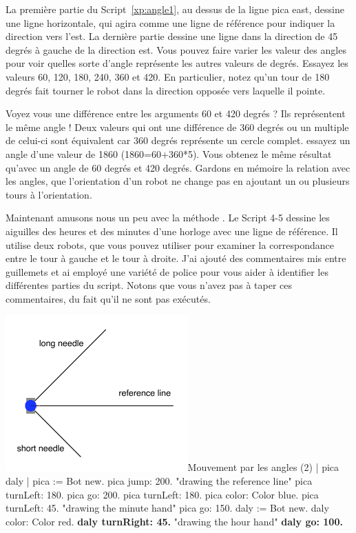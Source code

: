 \documentclass[a4paper,10pt,twoside]{book}
\begin{document}
La premi\`ere partie du Script~\ref{xp:angle1}, au dessus de la ligne pica east, dessine une ligne horizontale, 
qui agira comme une ligne de r\'ef\'erence pour indiquer la direction vers l'est. La derni\`ere partie dessine une 
ligne dans la direction de 45 degr\'es \`a gauche de la direction est. Vous pouvez faire varier les valeur des 
angles pour voir quelles sorte d'angle repr\'esente les autres valeurs de degr\'es. Essayez les valeurs 
60, 120, 180, 240, 360 et 420. En particulier, notez qu'un tour de 180 degr\'es fait tourner le robot dans la 
direction oppos\'ee vers laquelle il pointe.

Voyez vous une diff\'erence entre les arguments 60 et 420 degr\'es ? Ils repr\'esentent le m\^eme angle ! 
Deux valeurs qui ont une diff\'erence de 360 degr\'es ou un multiple de celui-ci sont \'equivalent car 360 degr\'es 
repr\'esente un cercle complet. essayez un angle d'une valeur de 1860 (1860=60+360*5). Vous obtenez le m\^eme 
r\'esultat qu'avec un angle de 60 degr\'es et 420 degr\'es. Gardons en m\'emoire la relation avec les angles, que 
l'orientation d'un robot ne change pas en ajoutant un ou plusieurs tours \`a l'orientation.

Maintenant amusons nous un peu avec la m\'ethode . Le Script 4-5 dessine les aiguilles des heures 
et des minutes d'une horloge avec une ligne de r\'ef\'erence. Il utilise deux robots, que vous pouvez utiliser pour 
examiner la correspondance entre le tour \`a gauche et le tour \`a droite. J'ai ajout\'e des commentaires mis entre 
guillemets et ai employ\'e une vari\'et\'e de police pour vous aider \`a identifier les diff\'erentes parties du script. 
Notons que vous n'avez pas \`a taper ces commentaires, du fait qu'il ne sont pas ex\'ecut\'es. 


\begin{scriptfigwithsize}[0.4]{\includegraphics[width=7cm]{twoAnglesAnnotated}}{Mouvement par les  angles (2)}\label{xp:angle2}
	| pica daly | 
	pica := Bot new. 
	pica jump: 200. 
	"drawing the reference line" 
	pica turnLeft: 180. 
	pica go: 200. 
	pica turnLeft: 180. 
	pica color: Color blue. 
	pica turnLeft: 45.       
	"drawing the minute hand" 
	pica go: 150. 
	daly := Bot new. 
	daly color: Color red. 
	\textbf{daly turnRight: 45.}  
	"drawing the hour hand" 
	\textbf{daly go: 100.} 
\end{scriptfigwithsize}
\end{document}
